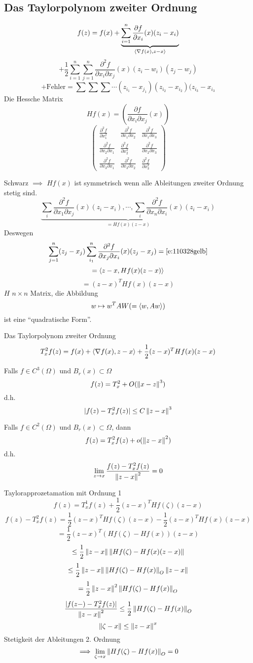 \subsection{Das Taylorpolynom zweiter Ordnung}
\[f(z)=f(x)+\underbrace{\sum^n_{i=1}\dfrac{\partial f}{\partial x_i}(x)(z_i-x_i)}_{\langle \nabla f(x), z-x \rangle}\]
\begin{equation}
  \label{e:110328gelb}
  +\frac{1}{2}\sum^n_{i=1}\sum^n_{j=1}\frac{\partial^2f}{\partial x_i\partial x_j}(x)(z_i-w_i)(z_j-w_j)
\end{equation}
\[+ \text{Fehler} = \sum\sum\sum\cdots(z_{i_1}-x_{j_1})(z_{i_2}-x_{i_2})(z_{i_3}-x_{i_3}\]
Die Hessche Matrix
\[Hf(x)=\left( \frac{\partial f}{\partial x_i\partial x_j}(x) \right)\]
\[ \begin{pmatrix}
  \frac{\partial^2 f}{\partial x_1^2} & \frac{\partial^2 f}{\partial x_1\partial x_2} & \frac{\partial^2 f}{\partial x_1\partial x_3} \\
  \frac{\partial^2 f}{\partial x_2\partial x_1} & \frac{\partial^2 f}{\partial x_2^2} & \frac{\partial^2 f}{\partial x_2\partial x_3} \\
  \frac{\partial^2 f}{\partial x_3\partial x_1} & \frac{\partial^2 f}{\partial x_3\partial x_2}& \frac{\partial^2 f}{\partial x_3^2}
\end{pmatrix}\]
\begin{Bem}
  Schwarz $\implies$ $Hf(x)$ ist symmetrisch wenn alle Ableitungen zweiter Ordnung stetig sind.
  \[\underbrace{\sum_i\frac{\partial^2 f}{\partial x_1\partial x_j}(x)(z_i-x_i),\cdots,\sum_i\frac{\partial^2 f}{\partial x_n\partial x_i}(x)(z_i-x_i)}_{=Hf(x)(z-x)}\]
  Deswegen
  \[\sum^n_{j=1}(z_j-x_j)\sum^n_{i_1}\frac{\partial^2 f}{\partial x_j\partial x_i}(x)(z_j-x_j)=\ref{e:110328gelb}\]
  \[=\langle z-x, Hf(x)(z-x) \rangle\]
  \[=(z-x)^THf(x)(z-x)\]
  $H$ $n\times n$ Matrix, die Abbildung
  \[w\mapsto w^T A W (=\langle w,Aw \rangle)\]
  ist eine ``quadratische Form''.
\end{Bem}
Das Taylorpolynom zweiter Ordnung
\[T^2_xf(z)=f(x)+\langle \nabla f(x), z-x \rangle+\frac{1}{2}(z-x)^T Hf(x)(z-x)\]
\begin{Kor}
  Falls $f\in C^3(\Omega)$ und $B_r(x)\subset\Omega$
  \[f(z)=T^2_x+O(\left\| x-z \right\|^3)\]
  d.h.
  \[\mathopen| f(z)-T_x^2f(z) \mathclose|\leq C\left\| z-x \right\|^3\]
\end{Kor}
\begin{Kor}
  Falls $f\in C^2(\Omega)$ und $B_r(x)\subset\Omega$, dann
  \[f(z)=T^2_xf(z)+o(\left\| z-x \right\|^2)\]
  d.h.
  \[\lim_{z\rightarrow x}\frac{f(z)-T_x^2f(z)}{\left\| z-x \right\|^2}=0\]
\end{Kor}
\begin{Bew}
  Taylorapprozetamation mit Ordnung 1
  \[f(z)=T^1_xf(z)+\frac{1}{2}(z-x)^THf(\zeta)(z-x)\]
  \[f(z)-T_x^2f(z)=\frac{1}{2}(z-x)^THf(\zeta)(z-x)-\frac{1}{2}(z-x)^THf(x)(z-x)\]
  \[=\frac{1}{2}(z-x)^T(Hf(\zeta)-Hf(x))(z-x)\]
  \[\leq \frac{1}{2}\left\| z-x \right\|\left\| Hf(\zeta)-Hf(x)(z-x) \right\|\]
  \[\leq \frac{1}{2}\left\| z-x \right\|\left\| Hf(\zeta)-Hf(x) \right\|_O\left\| z-x \right\|\]
  \[= \frac{1}{2}\left\| z-x \right\|^2\left\| Hf(\zeta)-Hf(x) \right\|_O\]
  \[\frac{\mathopen| f(z-)-T_x^2f(z) \mathclose|}{\left\| z-x \right\|^2}\leq\frac{1}{2}\left\| Hf(\zeta)-Hf(x) \right\|_O\]
  \[\left\| \zeta-x \right\|\leq\left\| z-x \right\|^x\]
  Stetigkeit der Ableitungen 2. Ordnung
  \[\implies \lim_{\zeta\rightarrow x}\left\| Hf(\zeta)-Hf(x) \right\|_O=0\]
\end{Bew}
